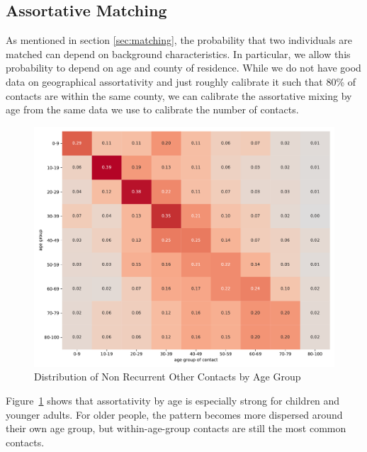 \FloatBarrier


\subsection{Assortative Matching}

As mentioned in section \ref{sec:matching}, the probability that two individuals are
matched can depend on background characteristics. In particular, we allow this
probability to depend on age and county of residence. While we do not have good data on
geographical assortativity and just roughly calibrate it such that 80\% of contacts are
within the same county, we can calibrate the assortative mixing by age from the same
data we use to calibrate the number of contacts.

\begin{figure}[ht]
    \centering
    \includegraphics[width=0.9 \textwidth]{../figures/results/figures/data/assortativity_other_non_recurrent}
    \caption{Distribution of Non Recurrent Other Contacts by Age Group}
    \label{fig:assortativity_other}
\end{figure}


Figure~\ref{fig:assortativity_other} shows that assortativity by age is especially strong
for children and younger adults. For older people, the pattern becomes more dispersed
around their own age group, but within-age-group contacts are still the most common
contacts.

